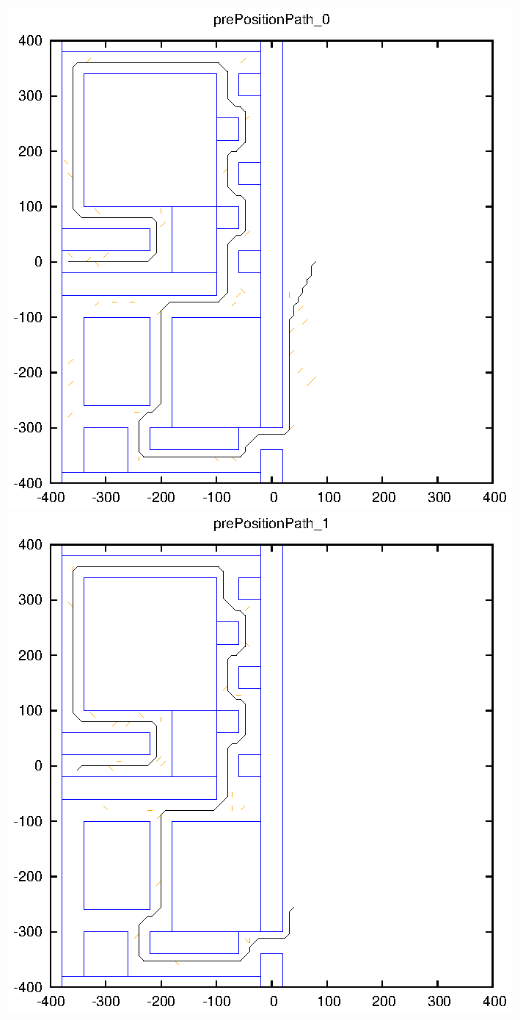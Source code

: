 \documentclass{article}
\begin{document}
\includegraphics[width=\textwidth]{graphics/prePosition_0}
\includegraphics[width=\textwidth]{graphics/prePosition_1}
\end{document}
